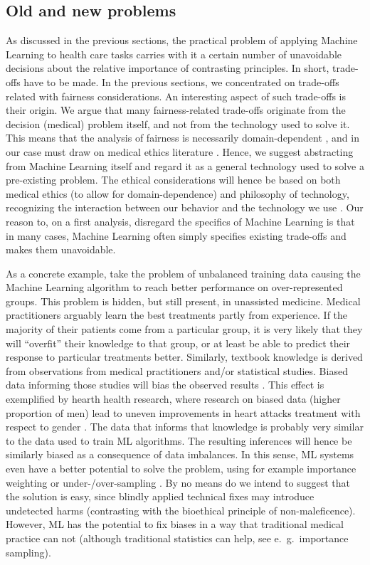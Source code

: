 \subsection{Old and new problems}
    As discussed in the previous sections, the practical problem of applying Machine Learning to health care tasks carries with it a certain number of unavoidable decisions about the relative importance of contrasting principles.
    In short, trade-offs have to be made.
    In the previous sections, we concentrated on trade-offs related with fairness considerations.
    An interesting aspect of such trade-offs is their origin.
    We argue that many fairness-related trade-offs originate from the decision (medical) problem itself, and not from the technology used to solve it.
    This means that the analysis of fairness is necessarily domain-dependent \cite[p.~5]{Fletcher2021}, and in our case must draw on medical ethics literature \cite[p.~2]{Morley2020}.
    Hence, we suggest abstracting from Machine Learning itself and regard it as a general technology used to solve a pre-existing problem.
    The ethical considerations will hence be based on both medical ethics (to allow for domain-dependence) and philosophy of technology, recognizing the interaction between our behavior and the technology we use \cite{Dijkstra2020}.
    Our reason to, on a first analysis, disregard the specifics of Machine Learning is that in many cases, Machine Learning often simply specifies existing trade-offs and makes them unavoidable.

    As a concrete example, take the problem of unbalanced training data causing the Machine Learning algorithm to reach better performance on over-represented groups.
    This problem is hidden, but still present, in unassisted medicine.
    Medical practitioners arguably learn the best treatments partly from experience.
    If the majority of their patients come from a particular group, it is very likely that they will ``overfit'' their knowledge to that group, or at least be able to predict their response to particular treatments better.
    Similarly, textbook knowledge is derived from observations from medical practitioners and/or statistical studies.
    Biased data informing those studies will bias the observed results \cite{Chen2021}.
    This effect is exemplified by hearth health research, where research on biased data (higher proportion of men) lead to uneven improvements in heart attacks treatment with respect to gender \cite[e221]{Mccradden2020}.
    The data that informs that knowledge is probably very similar to the data used to train ML algorithms.
    The resulting inferences will hence be similarly biased as a consequence of data imbalances.
    In this sense, ML systems even have a better potential to solve the problem, using for example importance weighting or under-/over-sampling \cite[pp.~6-8]{Chen2021}.
    By no means do we intend to suggest that the solution is easy, since blindly applied technical fixes may introduce undetected harms (contrasting with the bioethical principle of non-maleficence).
    However, ML has the potential to fix biases in a way that traditional medical practice can not \cite[p.~e222]{Mccradden2020} (although traditional statistics can help, see e.~g.~importance sampling).

